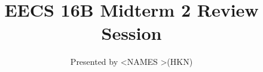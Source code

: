 

\title{EECS 16B Midterm 2 Review Session}
\author{Presented by \textless NAMES \textgreater (HKN)}
\date{}

\newcommand{\SlideAccessingLogistics}{@\#}















